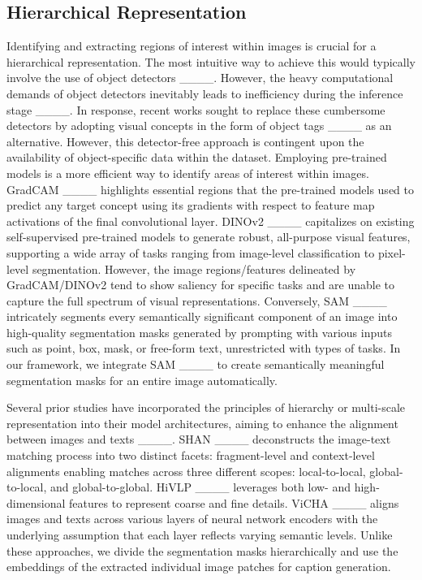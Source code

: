 \subsection{Hierarchical Representation}\label{rw:hier}
Identifying and extracting regions of interest within images is crucial for a hierarchical representation. The most intuitive way to achieve this would typically 
involve the use of object detectors ____. However, the heavy computational demands of object detectors inevitably leads to inefficiency during the inference stage ____. In response, recent works sought to replace these cumbersome detectors by adopting visual concepts in the form of object tags ____ as an alternative. However, this detector-free approach is contingent upon the availability of object-specific data within the dataset. Employing pre-trained models is a more efficient way to identify areas of interest within images. GradCAM ____ highlights essential regions that the pre-trained models used to predict any target concept using its gradients with respect to feature map activations of the final convolutional layer. DINOv2 ____ capitalizes on existing self-supervised pre-trained models to generate robust, all-purpose visual features, supporting a wide array of tasks ranging from image-level classification to pixel-level segmentation. However, the image regions/features delineated by GradCAM/DINOv2 tend to show saliency for specific tasks and are unable to capture the full spectrum of visual representations. Conversely, SAM ____ intricately segments every semantically significant component of an image into high-quality segmentation masks generated by prompting with various inputs such as point, box, mask, or free-form text, unrestricted with types of tasks. In our framework, we integrate SAM ____ to create semantically meaningful segmentation masks for an entire image automatically.


Several prior studies have incorporated the principles of hierarchy or multi-scale representation into their model architectures, aiming to enhance the alignment between images and texts ____. SHAN ____ deconstructs the image-text matching process into two distinct facets: fragment-level and context-level alignments enabling matches across three different scopes: local-to-local, global-to-local, and global-to-global. HiVLP ____ leverages both low- and high-dimensional features to represent coarse and fine details. ViCHA ____ aligns images and texts across various layers of neural network encoders with the underlying assumption that each layer reflects varying semantic levels. Unlike these approaches, we divide the segmentation masks hierarchically and use the embeddings of the extracted individual image patches for caption generation.

